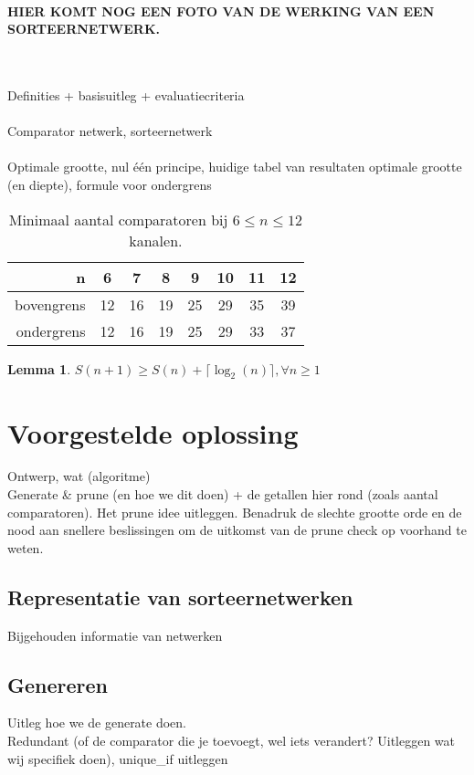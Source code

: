 \documentclass{article}
\newtheorem{lemma}{Lemma}
\begin{document}
~\\ \textbf{HIER KOMT NOG EEN FOTO VAN DE WERKING VAN EEN SORTEERNETWERK.}



~\\\\Definities + basisuitleg + evaluatiecriteria\\ \\
Comparator netwerk, sorteernetwerk\\ \\
Optimale grootte, nul \'e\'en principe, huidige tabel van resultaten optimale grootte (en diepte), formule voor ondergrens\\

\begin{table}[h!]

\begin{tabular}{r|c|c|c|c|c|c|c}
n & 6 & 7 & 8 & 9 & 10 & 11 & 12\\ 
\hline 
bovengrens & 12 & 16 & 19 & 25 & 29 & 35 & 39\\ 
\hline 
ondergrens & 12 & 16 & 19 & 25& 29 & 33 & 37\\
\end{tabular} 
\caption{Minimaal aantal comparatoren bij $6 \leq n \leq 12$ kanalen.}
\label{tabel1}
\end{table}

\begin{lemma}
$S(n+1) \geq S(n) + \lceil \log_2(n) \rceil, \forall n \geq 1$
\label{lemma1}
\end{lemma}

\section{Voorgestelde oplossing}
Ontwerp, wat (algoritme)\\
Generate \& prune (en hoe we dit doen) + de getallen hier rond (zoals aantal comparatoren). Het prune idee uitleggen. Benadruk de slechte grootte orde en de nood aan snellere beslissingen om de uitkomst van de prune check op voorhand te weten.

\subsection{Representatie van sorteernetwerken}
Bijgehouden informatie van netwerken

\subsection{Genereren}
Uitleg hoe we de generate doen.\\
Redundant (of de comparator die je toevoegt, wel iets verandert? Uitleggen wat wij specifiek doen), unique\_if uitleggen
\end{document}
